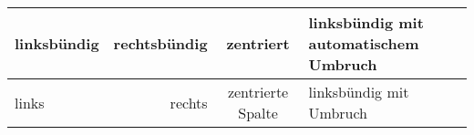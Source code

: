 \documentclass[12pt,ngerman]{scrartcl}
\begin{document}
\begin{tabular}{|l|r|c|p{5cm}|} \hline
linksbündig & rechtsbündig & zentriert & linksbündig mit automatischem Umbruch \\ \hline
links & rechts & zentrierte Spalte & linksbündig mit Umbruch \\ \hline
\end{tabular}
\end{document}
